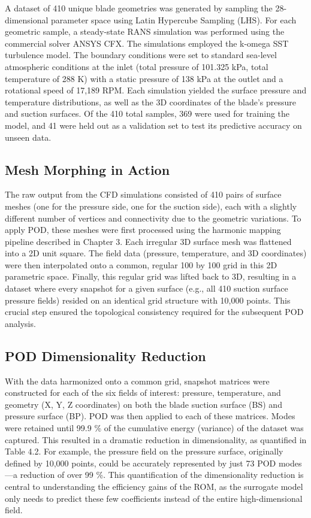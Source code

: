\documentclass[dsc, EN]{ufabcFHZh}
\begin{document}
{A dataset of 410 unique blade geometries was generated by sampling the 28-dimensional parameter space using Latin Hypercube Sampling (LHS). For each geometric sample, a steady-state RANS simulation was performed using the commercial solver ANSYS CFX. The simulations employed the k-omega SST turbulence model. The boundary conditions were set to standard sea-level atmospheric conditions at the inlet (total pressure of 101.325 kPa, total temperature of 288 K) with a static pressure of 138 kPa at the outlet and a rotational speed of 17,189 RPM. Each simulation yielded the surface pressure and temperature distributions, as well as the 3D coordinates of the blade's pressure and suction surfaces. Of the 410 total samples, 369 were used for training the model, and 41 were held out as a validation set to test its predictive accuracy on unseen data. 

\subsection{Mesh Morphing in Action}

The raw output from the CFD simulations consisted of 410 pairs of surface meshes (one for the pressure side, one for the suction side), each with a slightly different number of vertices and connectivity due to the geometric variations. To apply POD, these meshes were first processed using the harmonic mapping pipeline described in Chapter 3. Each irregular 3D surface mesh was flattened into a 2D unit square. The field data (pressure, temperature, and 3D coordinates) were then interpolated onto a common, regular 100 by 100 grid in this 2D parametric space. Finally, this regular grid was lifted back to 3D, resulting in a dataset where every snapshot for a given surface (e.g., all 410 suction surface pressure fields) resided on an identical grid structure with 10,000 points. This crucial step ensured the topological consistency required for the subsequent POD analysis.  

\subsection{ POD Dimensionality Reduction}

With the data harmonized onto a common grid, snapshot matrices were constructed for each of the six fields of interest: pressure, temperature, and geometry (X, Y, Z coordinates) on both the blade suction surface (BS) and pressure surface (BP). POD was then applied to each of these matrices. Modes were retained until 99.9 \% of the cumulative energy (variance) of the dataset was captured. This resulted in a dramatic reduction in dimensionality, as quantified in Table 4.2. For example, the pressure field on the pressure surface, originally defined by 10,000 points, could be accurately represented by just 73 POD modes—a reduction of over 99 \%. This quantification of the dimensionality reduction is central to understanding the efficiency gains of the ROM, as the surrogate model only needs to predict these few coefficients instead of the entire high-dimensional field.

}
\end{document}
